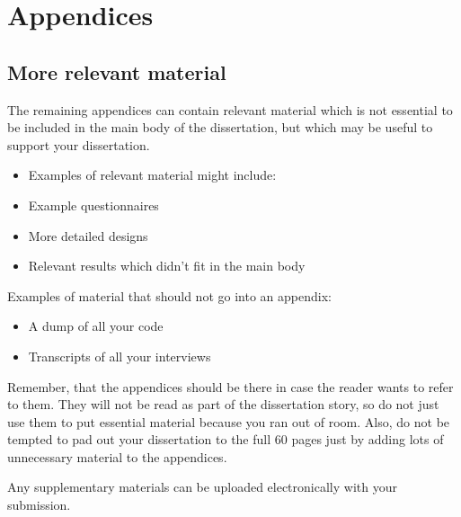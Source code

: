 %
%

\chapter{Appendices}

\section{More relevant material}

The remaining appendices can contain relevant material which is not essential
to be included in the main body of the dissertation, but which may be useful to
support your dissertation.

\begin{itemize}
  \item Examples of relevant material might include:
  \item Example questionnaires
  \item More detailed designs
  \item Relevant results which didn’t fit in the main body
\end{itemize}

Examples of material that should not go into an appendix:

\begin{itemize}
  \item A dump of all your code
  \item Transcripts of all your interviews
\end{itemize}

Remember, that the appendices should be there in case the reader wants to refer
to them.  They will not be read as part of the dissertation story, so do not
just use them to put essential material because you ran out of room.  Also, do
not be tempted to pad out your dissertation to the full 60 pages just by adding
lots of unnecessary material to the appendices.

Any supplementary materials can be uploaded electronically with your
submission.
